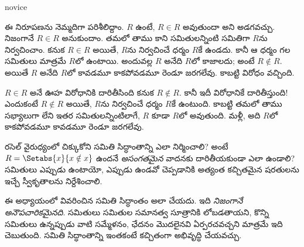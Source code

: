 \documentclass[../../../include/open-logic-section]{subfiles}
\begin{document}
\begin{tagblock}{novice}
\begin{explain}
ఈ నిరూపణను నెమ్మదిగా పరిశీలిద్దాం. $R$ ఉంటే, $R \in R$ అవుతుందా
అని అడగవచ్చు. నిజంగానే $R \in R$ అనుకుందాం. తమలో తాము
 కాని సమితులన్నింటి సమితిగా $R$ను నిర్వచించాం.
కనుక $R \in R$ అయితే, $R$ను నిర్వచించే ధర్మం $R$కే ఉండదు.
కానీ ఆ ధర్మం గల సమితులు మాత్రమే $R$లో ఉంటాయి. అందువల్ల
$R$ అనేది $R$లో  కాజాలదు; అంటే $R \notin R$.
అయితే $R$ అనేది $R$లో  కావడమూ కాకపోవడమూ
రెండూ జరగలేవు. కాబట్టి విరోధం వచ్చింది.

$R \in R$ అనే ఊహ విరోధానికి దారితీసింది కనుక $R \notin R$.
కానీ ఇదీ విరోధానికే దారితీస్తుంది!{} ఎందుకంటే $R \notin R$ అయితే,
$R$ను నిర్వచించే ధర్మం $R$కే ఉంటుంది. కాబట్టి తమలో తాము సభ్యాలుగా
లేని ఇతర సమితులన్నింటిలాగే, $R$ కూడా $R$లో  అవుతుంది.
మళ్లీ, అది $R$లో  కాకపోవడమూ కావడమూ
రెండూ జరగలేవు.
\end{explain}
\end{tagblock}

\begin{digress}
రసెల్ వైరుధ్యంలో చిక్కుకోని సమితి సిద్ధాంతాన్ని ఎలా నిర్మించాలి?
అంటే $R = \Setabs{x}{x \notin x}$ ఉందనే \emph{అసంగతమైన}
వాదనకు దారితీయకుండా ఎలా ఉండాలి? సమితులు ఎప్పుడు ఉంటాయో,
ఎప్పుడు ఉండవో చెప్పడానికి అత్యంత కచ్చితమైన షరతులను ఇచ్చే
స్వీకృతాలను నిర్దేశించాలి.

ఈ అధ్యాయంలో వివరించిన సమితి సిద్ధాంతం అలా చేయదు. ఇది
\emph{నిజంగానే అనౌపచారికమైనది}. సమితులు సమితుల సమానత్వ సూత్రానికి
లోబడతాయని, కొన్ని సమితులు ఉన్నప్పుడు వాటి సమ్మేళనం, ఛేదనం మొదలైనవి
ఏర్పరచవచ్చని మాత్రమే ఇది చెబుతుంది. సమితి సిద్ధాంతాన్ని ఇంతకంటే
కచ్చితంగా అభివృద్ధి చేయవచ్చు.
\end{digress}
\end{document}
